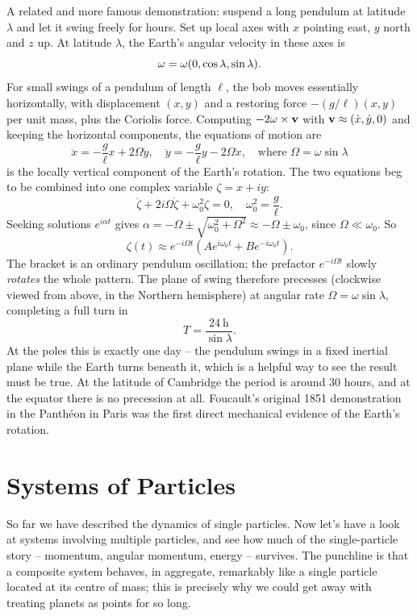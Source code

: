 \documentclass[a4paper]{scrartcl}
\begin{document}
\begin{example}
	A related and more famous demonstration: suspend a long pendulum at latitude $\lambda$ and let it swing freely for hours. Set up local axes with $x$ pointing east, $y$ north and $z$ up. At latitude $\lambda$, the Earth's angular velocity in these axes is
	$$
	\mathbf{\omega} = \omega(0, \cos\lambda, \sin \lambda).
	$$
	For small swings of a pendulum of length $\ell$, the bob moves essentially horizontally, with displacement $(x, y)$ and a restoring force $-(g/\ell)(x, y)$ per unit mass, plus the Coriolis force. Computing $-2\mathbf{\omega} \times \mathbf{v}$ with $\mathbf{v} \approx (\dot x, \dot y, 0)$ and keeping the horizontal components, the equations of motion are
	$$
	\ddot{x} = -\frac{g}{\ell}x + 2\Omega \dot{y}, \quad \ddot{y} = -\frac{g}{\ell}y - 2\Omega \dot{x}, \quad \text{where } \Omega = \omega \sin \lambda
	$$
	is the locally vertical component of the Earth's rotation. The two equations beg to be combined into one complex variable $\zeta = x + iy$:
	$$
	\ddot{\zeta} + 2i \Omega \dot{\zeta} + \omega_0^2 \zeta = 0, \quad \omega_0^2 = \frac{g}{\ell}.
	$$
	Seeking solutions $e^{i \alpha t}$ gives $\alpha = -\Omega \pm \sqrt{\omega_0^2 + \Omega^2} \approx -\Omega \pm \omega_0$, since $\Omega \ll \omega_0$. So
	$$
	\zeta(t) \approx e^{-i\Omega t}\left(A e^{i \omega_0 t} + B e^{-i\omega_0 t}\right).
	$$
	The bracket is an ordinary pendulum oscillation; the prefactor $e^{-i\Omega t}$ slowly \emph{rotates} the whole pattern. The plane of swing therefore precesses (clockwise viewed from above, in the Northern hemisphere) at angular rate $\Omega = \omega \sin\lambda$, completing a full turn in
	$$
	T = \frac{\SI{24}{\hour}}{\sin \lambda}.
	$$
	At the poles this is exactly one day -- the pendulum swings in a fixed inertial plane while the Earth turns beneath it, which is a helpful way to see the result must be true. At the latitude of Cambridge the period is around $30$ hours, and at the equator there is no precession at all. Foucault's original 1851 demonstration in the Panthéon in Paris was the first direct mechanical evidence of the Earth's rotation.
\end{example}


\section{Systems of Particles} \label{sec:systems}

So far we have described the dynamics of single particles. Now let's have a look at systems involving multiple particles, and see how much of the single-particle story -- momentum, angular momentum, energy -- survives. The punchline is that a composite system behaves, in aggregate, remarkably like a single particle located at its centre of mass; this is precisely why we could get away with treating planets as points for so long.
\end{document}
